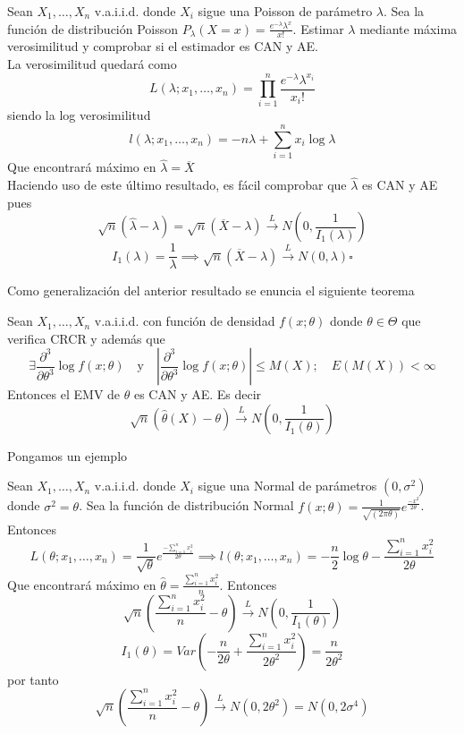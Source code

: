 \begin{exercise}
    Sean $X_1, \dots, X_n$ v.a.i.i.d. donde $X_i$ sigue una Poisson de parámetro $\lambda$. Sea la función de distribución Poisson $P_\lambda(X=x)=\frac{e^{-\lambda}\lambda^x}{x!}$. Estimar $\lambda$ mediante máxima verosimilitud y comprobar si el estimador es CAN y AE. \\
    La verosimilitud quedará como
    \[
        L(\lambda;x_1,\dots,x_n)=\prod_{i=1}^{n}\frac{e^{-\lambda}\lambda^{x_i}}{{x_i}!}
    \]
    siendo la log verosimilitud
    \[
        l(\lambda; x_1,\dots,x_n)=-n\lambda+\sum_{i=1}^{n}x_i\log\lambda
    \]
    Que encontrará máximo en $\widehat{\lambda}=\overline{X}$ \\
    Haciendo uso de este último resultado, es fácil comprobar que $\widehat{\lambda}$ es CAN y AE pues
    \[
        \sqrt{n}(\widehat{\lambda}-\lambda)=\sqrt{n}(\overline{X}-\lambda) \overset{L}{\to}N(0,\frac{1}{I_1(\lambda)})
    \]
    \[
        I_1(\lambda)=\frac{1}{\lambda} \implies \sqrt{n}(\overline{X}-\lambda)\overset{L}{\to}N(0,\lambda)\square
    \]
\end{exercise}

\newpage

Como generalización del anterior resultado se enuncia el siguiente teorema

\begin{theorem}
    Sean $X_1,\dots,X_n$ v.a.i.i.d. con función de densidad $f(x;\theta)$ donde $\theta \in \Theta$ que verifica CRCR y además que
    \[
        \exists \frac{\partial^3}{\partial \theta^3}\log f(x;\theta) \quad \text{y} \quad \left|\frac{\partial^3}{\partial \theta^3}\log f(x;\theta)\right| \leq M(X); \quad E(M(X))<\infty
    \]
    Entonces el EMV de $\theta$ es CAN y AE. Es decir
    \[
        \sqrt{n}(\widehat{\theta}(X)-\theta)\overset{L}{\to}N(0,\frac{1}{I_1(\theta)})
    \]
\end{theorem}

Pongamos un ejemplo

\begin{exercise}
    Sean $X_1, \dots, X_n$ v.a.i.i.d. donde $X_i$ sigue una Normal de parámetros $(0,\sigma^2)$ donde $\sigma^2=\theta$. Sea la función de distribución Normal $f(x;\theta)=\frac{1}{\sqrt{(2\pi\theta)}}e^{\frac{-x^2}{2\theta}}$. Entonces
    \[
        L(\theta;x_1,\dots,x_n)=\frac{1}{\sqrt{\theta}}e^{\frac{-\sum_{i=1}^{n}x^2_i}{2\theta}} \implies l(\theta;x_1,\dots,x_n)=-\frac{n}{2}\log\theta - \frac{\sum_{i=1}^{n}x^2_i}{2\theta}
    \]
    Que encontrará máximo en $\widehat{\theta}=\frac{\sum_{i=1}^{n}x^2_i}{n}$. Entonces
    \[
        \sqrt{n}\left(\frac{\sum_{i=1}^{n}x^2_i}{n}-\theta\right)\overset{L}{\to}N\left(0,\frac{1}{I_1(\theta)}\right)
    \]
    \[
        I_1(\theta)=Var\left(-\frac{n}{2\theta}+\frac{\sum_{i=1}^{n}x^2_i}{2\theta^2}\right)=\frac{n}{2\theta^2}
    \]
    por tanto
    \[
        \sqrt{n}\left(\frac{\sum_{i=1}^{n}x^2_i}{n}-\theta\right) \overset{L}{\to}N(0,2\theta^2) = N(0,2\sigma^4)
    \]
\end{exercise}

